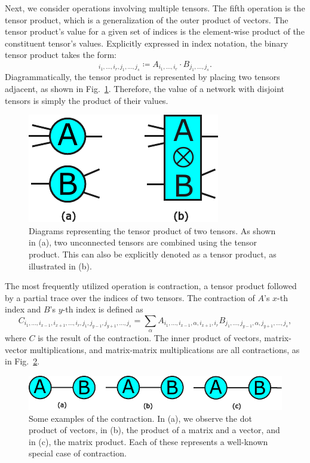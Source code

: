 \documentclass[12pt,dvipdfmx,twoside,openright]{report}
\begin{document}
Next, we consider operations involving multiple tensors.
The fifth operation is the tensor product, which is a generalization of the outer product of vectors.
The tensor product's value for a given set of indices is the element-wise product of the constituent tensor's values.
Explicitly expressed in index notation, the binary tensor product takes the form:
\begin{equation}
    [A\otimes B]_{i_1,\dots,i_r,j_1,\dots,j_s}\coloneqq A_{i_1,\dots,i_r}\cdot B_{j_1,\dots,j_s}.
\end{equation}
Diagrammatically, the tensor product is represented by placing two tensors adjacent, as shown in Fig.~\ref{fig:tensor-product}.
Therefore, the value of a network with disjoint tensors is simply the product of their values.
\begin{figure}
    \centering
    \includegraphics[width=0.4\linewidth]{tensor-product.pdf}
    \caption{Diagrams representing the tensor product of two tensors.
    As shown in (a), two unconnected tensors are combined using the tensor product. 
    This can also be explicitly denoted as a tensor product, as illustrated in (b).}
    \label{fig:tensor-product}
\end{figure}

The most frequently utilized operation is contraction, a tensor product followed by a partial trace over the indices of two tensors.
The contraction of $A$'s $x$-th index and $B$'s $y$-th index is defined as
\begin{equation}
    C_{i_1,\dots,i_{x-1},i_{x+1},\dots,i_r,j_1,j_{y-1},j_{y+1},\dots,j_s}=\sum_\alpha A_{i_1,\dots,i_{x-1},\alpha,i_{x+1},i_r}B_{j_1,\dots,j_{y-1},\alpha,j_{y+1},\dots,j_s},
\end{equation}
where $C$ is the result of the contraction.
The inner product of vectors, matrix-vector multiplications, and matrix-matrix multiplications are all contractions, as in Fig.~\ref{fig:contraction}.
\begin{figure}
    \centering
    \includegraphics[width=0.8\linewidth]{fig-contraction.pdf}
    \caption{Some examples of the contraction.
    In (a), we observe the dot product of vectors, in (b), the product of a matrix and a vector, and in (c), the matrix product. 
    Each of these represents a well-known special case of contraction.}
    \label{fig:contraction}
\end{figure}
\end{document}
